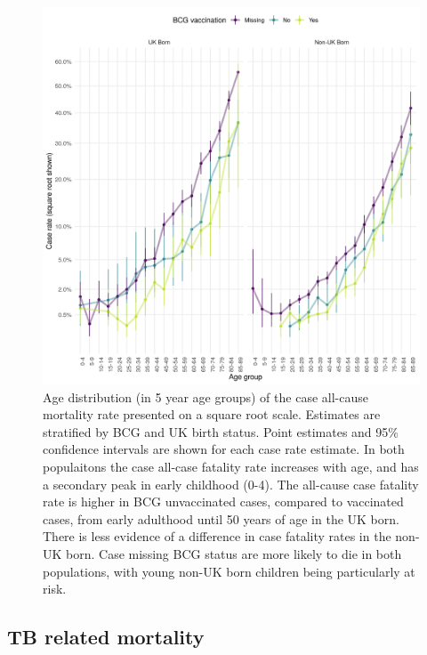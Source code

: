 \documentclass[11pt,twoside]{bristolthesis}
\begin{document}
  \begin{figure}
  
  {\centering \includegraphics[width=0.8\linewidth]{chapters/tb-epi-england/figures/plot-all-mort-age-dist} 
  
  }
  
  \caption{Age distribution (in 5 year age groups) of the case all-cause mortality rate presented on a square root scale. Estimates are stratified by BCG and UK birth status. Point estimates and 95\%  confidence intervals are shown for each case rate estimate. In both populaitons the case all-case fatality rate increases with age, and has a secondary peak in early childhood (0-4). The all-cause case fatality rate is higher in BCG unvaccinated cases, compared to vaccinated cases, from early adulthood until 50 years of age in the UK born. There is less evidence of a difference in case fatality rates in the non-UK born. Case missing BCG status are more likely to die in both populations, with young non-UK born children being particularly at risk.}\label{fig:plot-all-mort-age-dist}
  \end{figure}
  \hypertarget{tb-related-mortality}{%
  \subsection{TB related mortality}\label{tb-related-mortality}}
  
\end{document}
